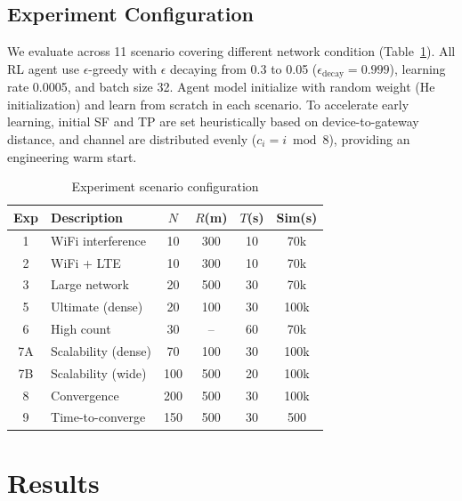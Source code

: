 \documentclass[conference]{IEEEtran}
\begin{document}
\subsection{Experiment Configuration}

We evaluate across 11 scenario covering different network condition (Table~\ref{tab:scenarios}). All RL agent use $\epsilon$-greedy with $\epsilon$ decaying from 0.3 to 0.05 ($\epsilon_{\text{decay}} = 0.999$), learning rate 0.0005, and batch size 32. Agent model initialize with random weight (He initialization) and learn from scratch in each scenario. To accelerate early learning, initial SF and TP are set heuristically based on device-to-gateway distance, and channel are distributed evenly ($c_i = i \bmod 8$), providing an engineering warm start.

\begin{table}[t]
\centering
\caption{Experiment scenario configuration}
\label{tab:scenarios}
\footnotesize
\begin{tabular}{@{}clcccc@{}}
\toprule
\textbf{Exp} & \textbf{Description} & \textbf{$N$} & \textbf{$R$(m)} & \textbf{$T$(s)} & \textbf{Sim(s)} \\
\midrule
1  & WiFi interference     & 10  & 300 & 10 & 70k \\
2  & WiFi + LTE            & 10  & 300 & 10 & 70k \\
3  & Large network         & 20  & 500 & 30 & 70k \\
5  & Ultimate (dense)      & 20  & 100 & 30 & 100k \\
6  & High count            & 30  & --  & 60 & 70k \\
\midrule
7A & Scalability (dense)   & 70  & 100 & 30 & 100k \\
7B & Scalability (wide)    & 100 & 500 & 20 & 100k \\
8  & Convergence           & 200 & 500 & 30 & 100k \\
9  & Time-to-converge      & 150 & 500 & 30 & 500 \\
\bottomrule
\end{tabular}
\end{table}

\section{Results}
\label{sec:results}
\end{document}
